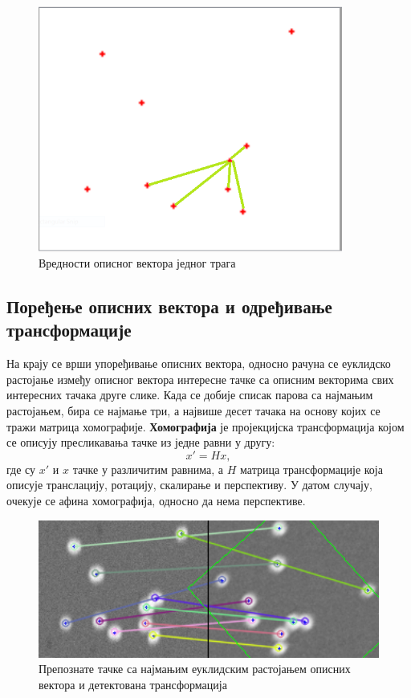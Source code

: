 \documentclass[11pt,a4paper,serbian,oneside]{book}
\begin{document}
\begin{figure}
\begin{center}
\includegraphics[width=100mm]{images/desc.png}
\end{center}
\caption{Вредности описног вектора једног трага}
\label{fig:desc}
\end{figure}

\subsection{Поређење описних вектора и одређивање трансформације}

На крају се врши упоређивање описних вектора, односно рачуна се еуклидско растојање између описног вектора интересне тачке са описним векторима свих интересних тачака друге слике.  Када се добије списак парова са најмањим растојањем, бира се најмање три, а највише десет тачака на основу којих се тражи матрица хомографије. \textbf{Хомографија} је пројекцијска трансформација којом се описују пресликавања тачке из једне равни у другу:
\begin{equation}
x \prime = H x,
\end{equation}
где су $x\prime$ и $x$ тачке у различитим равнима, а $H$ матрица трансформације која описује транслацију, ротацију, скалирање и перспективу. У датом случају, очекује се афина хо\-мо\-гра\-фи\-ја, односно да нема перспективе.

\begin{figure}[h]
\begin{center}
\includegraphics[width=150mm]{images/rotation.png}
\end{center}
\caption{Препознате тачке са најмањим еуклидским растојањем описних вектора и детектована трансформација}
\label{fig:rotation}
\end{figure}
\end{document}
